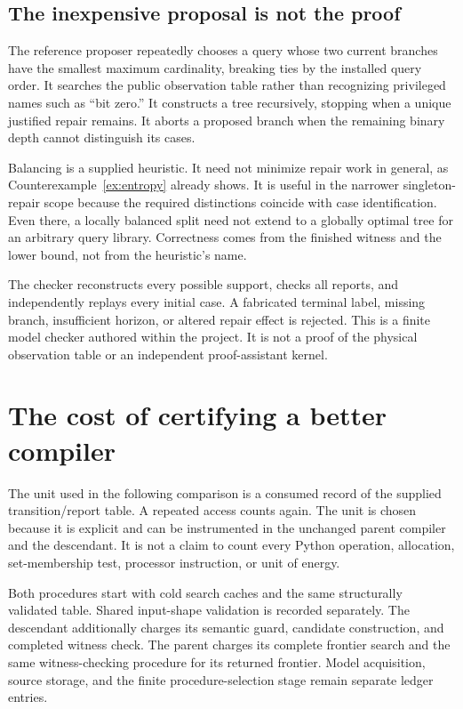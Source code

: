 \documentclass[11pt,letterpaper]{article}
\theoremstyle{plain}
\theoremstyle{definition}
\begin{document}
\subsection{The inexpensive proposal is not the proof}
The reference proposer repeatedly chooses a query whose two current branches have the smallest maximum cardinality, breaking ties by the installed query order. It searches the public observation table rather than recognizing privileged names such as ``bit zero.'' It constructs a tree recursively, stopping when a unique justified repair remains. It aborts a proposed branch when the remaining binary depth cannot distinguish its cases.

Balancing is a supplied heuristic. It need not minimize repair work in general, as Counterexample~\ref{ex:entropy} already shows. It is useful in the narrower singleton-repair scope because the required distinctions coincide with case identification. Even there, a locally balanced split need not extend to a globally optimal tree for an arbitrary query library. Correctness comes from the finished witness and the lower bound, not from the heuristic's name.

The checker reconstructs every possible support, checks all reports, and independently replays every initial case. A fabricated terminal label, missing branch, insufficient horizon, or altered repair effect is rejected. This is a finite model checker authored within the project. It is not a proof of the physical observation table or an independent proof-assistant kernel.

\section{The cost of certifying a better compiler}\label{sec:compiler-cost}
The unit used in the following comparison is a consumed record of the supplied transition/report table. A repeated access counts again. The unit is chosen because it is explicit and can be instrumented in the unchanged parent compiler and the descendant. It is not a claim to count every Python operation, allocation, set-membership test, processor instruction, or unit of energy.

Both procedures start with cold search caches and the same structurally validated table. Shared input-shape validation is recorded separately. The descendant additionally charges its semantic guard, candidate construction, and completed witness check. The parent charges its complete frontier search and the same witness-checking procedure for its returned frontier. Model acquisition, source storage, and the finite procedure-selection stage remain separate ledger entries.
\end{document}
